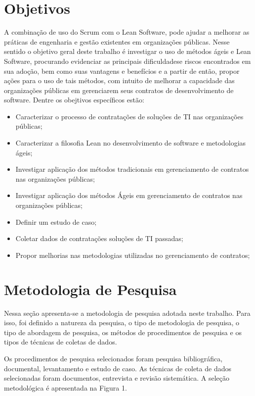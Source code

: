 \section[Objetivos]{Objetivos}

A combinação de uso do Scrum com o Lean Software, pode ajudar a melhorar as práticas de engenharia e gestão existentes em organizações públicas. Nesse sentido o objetivo geral deste trabalho é investigar o uso de métodos ágeis e Lean Software, procurando evidenciar as principais dificuldadese riscos encontrados em sua adoção, bem como suas vantagens e benefícios e a partir de então, propor ações para o uso de tais métodos, com intuito de melhorar a capacidade das organizações públicas em gerenciarem seus contratos de desenvolvimento de software. Dentre os obejtivos específicos estão:

\begin{itemize}
\item Caracterizar o processo de contratações de soluções de TI nas organizações públicas;
\item Caracterizar a filosofia Lean no desenvolvimento de software e metodologias ágeis;
\item Investigar aplicação dos métodos tradicionais em gerenciamento de contratos nas organizações públicas;
\item Investigar aplicação dos métodos Ágeis em gerenciamento de contratos nas organizações públicas;
\item Definir um estudo de caso;
\item Coletar dados de contratações soluções de TI passadas;
\item Propor melhorias nas metodologias utilizadas no gerenciamento de contratos;
\end{itemize}

\section[Metodologia de Pesquisa]{Metodologia de Pesquisa}

Nessa seção apresenta-se a metodologia de pesquisa adotada neste trabalho.
Para isso, foi definido a natureza da pesquisa, o tipo de metodologia de pesquisa, o tipo de abordagem de pesquisa, os métodos de
procedimentos de pesquisa e os tipos de técnicas de coletas de dados.

Os procedimentos de pesquisa selecionados foram pesquisa bibliográfica,
documental, levantamento e estudo de caso. As técnicas de coleta de dados selecionadas foram
documentos, entrevista e revisão sistemática. A seleção
metodológica é apresentada na Figura 1.

